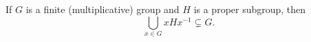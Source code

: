 If $G$ is a finite (multiplicative) group and $H$ is a proper subgroup, then
$$\bigcup_{x \in G} xHx^{-1} \subsetneq G.$$
